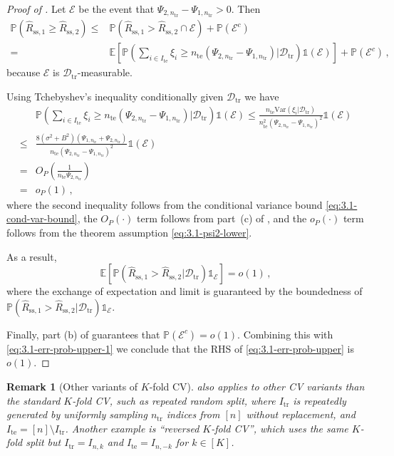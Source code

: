 \documentclass[11pt]{article}
\theoremstyle{plain}
\newtheorem{remark}[theorem]{Remark}
\newcommand{\ssp}{{\mathrm{ss}}}
\newcommand{\tr}{{\mathrm{tr}}}
\newcommand{\te}{{\mathrm{te}}}
\newcommand{\D}{{\mathcal{D}}}
\newcommand{\E}{{\mathcal{E}}}
\newcommand{\var}{\mathrm{Var}}
\begin{document}
\begin{proof}[Proof of ]
Let $\mathcal E$ be the event that $\Psi_{2,n_\tr}-\Psi_{1,n_\tr}>0$.
Then
\begin{align}
\mathbb P(\hat R_{\ssp,1}\ge\hat R_{\ssp,2})\le & \mathbb P(\hat R_{\ssp,1}>\hat R_{\ssp,2}\cap\mathcal E)+\mathbb P(\mathcal E^c)\nonumber\\
=&\mathbb E\left[\mathbb P\left(\sum_{i\in I_\te} \xi_i \ge n_\te (\Psi_{2,n_\tr}-\Psi_{1,n_\tr})\bigg|\D_\tr\right)\mathds{1}(\E)\right]+\mathbb P(\E^c)\,,\label{eq:3.1-err-prob-upper}
\end{align}
because $\mathcal E$ is $\D_\tr$-measurable.

Using Tchebyshev's inequality conditionally given $\D_\tr$ we have
\begin{align*}
   & \mathbb P\left(\sum_{i\in I_\te} \xi_i \ge n_\te (\Psi_{2,n_\tr}-\Psi_{1,n_\tr})\bigg|\D_\tr\right)\mathds{1}(\E)\le  \frac{n_\te{\var}(\xi_i|\D_\tr)}{n_\te^2(\Psi_{2,n_\tr}-\Psi_{1,n_\tr})^2}\mathds{1}(\E)\\
    \le & \frac{8(\sigma^2+B^2)(\Psi_{1,n_\tr}+\Psi_{2,n_\tr})}{n_\te(\Psi_{2,n_\tr}-\Psi_{1,n_\tr})^2}\mathds{1}(\E)\\
    =& O_P\left(\frac{1}{n_\te\Psi_{2,n_\tr}}\right)\\
    =& o_P(1)\,,
\end{align*}
where the second inequality follows from the conditional variance bound \eqref{eq:3.1-cond-var-bound}, the $O_P(\cdot)$ term follows from part~(c) of , and the $o_P(\cdot)$ term follows from the theorem assumption \eqref{eq:3.1-psi2-lower}.

As a result,
\begin{equation}
\label{eq:3.1-err-prob-upper-1}\mathbb E\left[\mathbb P(\hat R_{\ssp,1}>\hat R_{\ssp,2}|\D_\tr)\mathds{1}_{\E}\right]=o(1)\,,\end{equation}
where the exchange of expectation and limit is guaranteed by the boundedness of $\mathbb P(\hat R_{\ssp,1}>\hat R_{\ssp,2}|\D_\tr)\mathds{1}_{\E}$.

Finally, part (b) of  guarantees that $\mathbb P(\E^c)=o(1)$. Combining this with \eqref{eq:3.1-err-prob-upper-1} we conclude that the RHS of \eqref{eq:3.1-err-prob-upper} is $o(1)$. 
\end{proof}

\begin{remark}[Other variants of $K$-fold CV]\label{rem:3.1-arbitrary-split}
     also applies to other CV variants than the standard $K$-fold CV, such as repeated random split, where $I_\tr$ is repeatedly generated by uniformly sampling $n_\tr$ indices from $[n]$ without replacement, and $I_\te=[n]\setminus I_\tr$.  Another example is ``reversed $K$-fold CV'', which uses the same $K$-fold split but $I_\tr=I_{n,k}$ and $I_\te=I_{n,-k}$ for $k\in[K]$.
\end{remark}
\end{document}
